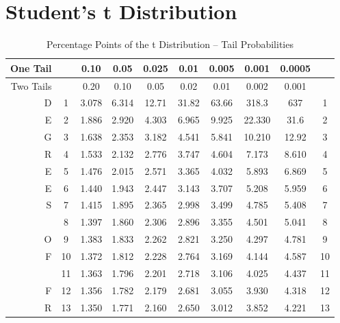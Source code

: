 
\chapter{Student's t Distribution}\label{AppendixA}
\newpage
{}

\begin{table}[H]
\caption{Percentage Points of the t Distribution -- Tail Probabilities} \label{Appendix}
\begin{center}
	{\renewcommand{\arraystretch}{1.8} %
{\tiny \begin{tabular}{|r|c|c|c|c|c|c|c|c|c|}
\hline One Tail & & 0.10 & 0.05 & 0.025 & 0.01 & 0.005 & 0.001 & 0.0005 &\\ 
\hline Two Tails & & 0.20 &   0.10 &   0.05 &   0.02  &  0.01  &  0.002 & 0.001 & \\ 
\hline D  & 1 &   3.078  & 6.314 & 12.71  & 31.82  & 63.66 & 318.3  & 637 & 1  \\ 
\hline E  & 2 &   1.886  & 2.920 &  4.303 &  6.965 &  9.925 & 22.330 & 31.6 & 2 \\ 
\hline G  & 3 &   1.638  & 2.353 &  3.182 &  4.541 &  5.841 & 10.210 & 12.92  &   3  \\ 
\hline R  & 4 &   1.533  & 2.132 &  2.776 &  3.747 &  4.604 &  7.173 &  8.610 &   4  \\ 
\hline E  & 5 &   1.476 &  2.015 &  2.571 &  3.365 &  4.032 &  5.893 &  6.869 &   5 \\ 
\hline E  & 6 &   1.440 &  1.943 &  2.447 &  3.143 &  3.707 &  5.208 &  5.959 &   6  \\ 
\hline S  & 7 &   1.415 &  1.895 &  2.365 &  2.998 &  3.499 &  4.785 &  5.408 &   7  \\ 
\hline    & 8 &   1.397 &  1.860 &  2.306 &  2.896 &  3.355 &  4.501 &  5.041 &   8  \\ 
\hline O  & 9 &   1.383 &  1.833 &  2.262 &  2.821 &  3.250 &  4.297 &  4.781 &   9  \\ 
\hline F  &10 &   1.372 &  1.812 &  2.228 &  2.764 &  3.169 &  4.144 &  4.587 &  10 \\ 
\hline    &11 &   1.363 &  1.796 &  2.201 &  2.718 &  3.106 &  4.025 &  4.437 &  11  \\ 
\hline F  &12 &   1.356 &  1.782 &  2.179 &  2.681 &  3.055 &  3.930 &  4.318 &  12  \\ 
\hline R  &13 &   1.350 &  1.771 &  2.160 &  2.650 &  3.012 &  3.852 &  4.221 &  13  \\ 

\end{tabular}}}
\end{center}
\end{table}
